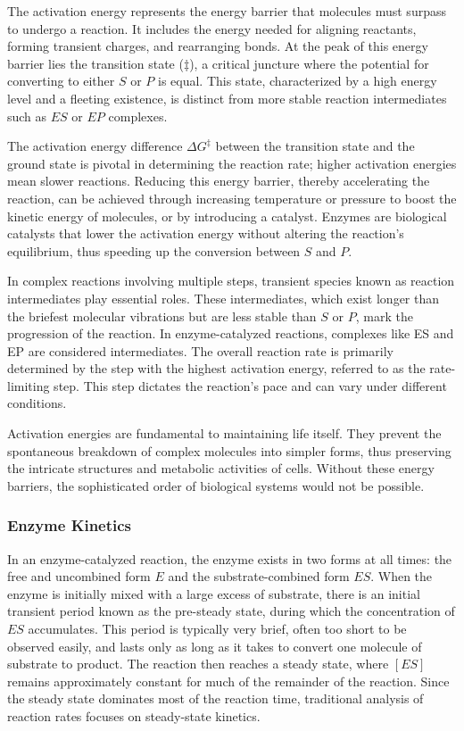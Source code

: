 The activation energy represents the energy barrier that molecules must surpass to undergo a reaction. It includes the energy needed for aligning reactants, forming transient charges, and rearranging bonds. At the peak of this energy barrier lies the transition state ($\ddag$), a critical juncture where the potential for converting to either $S$ or $P$ is equal. This state, characterized by a high energy level and a fleeting existence, is distinct from more stable reaction intermediates such as $ES$ or $EP$ complexes.

The activation energy difference $\Delta G^\ddag$ between the transition state and the ground state is pivotal in determining the reaction rate; higher activation energies mean slower reactions. Reducing this energy barrier, thereby accelerating the reaction, can be achieved through increasing temperature or pressure to boost the kinetic energy of molecules, or by introducing a catalyst. Enzymes are biological catalysts that lower the activation energy without altering the reaction's equilibrium, thus speeding up the conversion between $S$ and $P$.

In complex reactions involving multiple steps, transient species known as reaction intermediates play essential roles. These intermediates, which exist longer than the briefest molecular vibrations but are less stable than $S$ or $P$, mark the progression of the reaction. In enzyme-catalyzed reactions, complexes like ES and EP are considered intermediates. The overall reaction rate is primarily determined by the step with the highest activation energy, referred to as the rate-limiting step. This step dictates the reaction's pace and can vary under different conditions.

Activation energies are fundamental to maintaining life itself. They prevent the spontaneous breakdown of complex molecules into simpler forms, thus preserving the intricate structures and metabolic activities of cells. Without these energy barriers, the sophisticated order of biological systems would not be possible.

\subsubsection{Enzyme Kinetics}

In an enzyme-catalyzed reaction, the enzyme exists in two forms at all times: the free and uncombined form \(E\) and the substrate-combined form \(ES\). When the enzyme is initially mixed with a large excess of substrate, there is an initial transient period known as the pre-steady state, during which the concentration of \(ES\) accumulates. This period is typically very brief, often too short to be observed easily, and lasts only as long as it takes to convert one molecule of substrate to product. The reaction then reaches a steady state, where \([ES]\) remains approximately constant for much of the remainder of the reaction. Since the steady state dominates most of the reaction time, traditional analysis of reaction rates focuses on steady-state kinetics.

